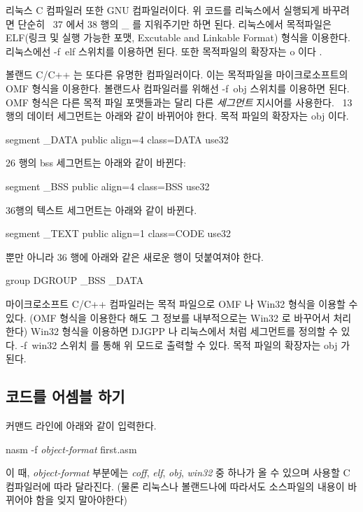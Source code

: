 리눅스 C 컴파일러 또한 GNU 컴파일러이다.  위 코드를 리눅스에서 실행되게 바꾸려면 단순히 ~37 에서 38 행의 \_ 를 지워주기만
하면 된다. 리눅스에서 목적파일은 ELF(링크 및 실행 가능한 포맷, Excutable and Linkable Format) 형식을 이용한다. 리눅스에선 {\code -f~elf} 스위치를
이용하면 된다. 또한 목적파일의 확장자는 {\code o} 이다 . 

볼랜드 C/C++  는 또다른 유명한 컴파일러이다. 이는 목적파일을 마이크로소프트의 OMF 형식을 이용한다. 볼랜드사 컴파일러를
위해선 {\code -f~obj} 스위치를 이용하면 된다. OMF 형식은 다른 목적 파일 포맷들과는 달리 다른 \emph{세그먼트} 지시어를 사용한다.  ~13 행의 데이터
세그먼트는 아래와 같이 바뀌어야 한다. 목적 파일의 확장자는 {\code obj} 이다.

\begin{CodeQuote}
segment \_DATA public align=4 class=DATA use32
\end{CodeQuote}
26 행의 bss 세그먼트는 아래와 같이 바뀐다:
\begin{CodeQuote}
segment \_BSS public align=4 class=BSS use32
\end{CodeQuote}
36행의 텍스트 세그먼트는 아래와 같이 바뀐다. 
\begin{CodeQuote}
segment \_TEXT public align=1 class=CODE use32
\end{CodeQuote}
뿐만 아니라 36 행에 아래와 같은 새로운 행이 덧붙여져야 한다. 
\begin{CodeQuote}
group DGROUP \_BSS \_DATA
\end{CodeQuote}

마이크로소프트 C/C++  컴파일러는 목적 파일으로 OMF 나 Win32 형식을 이용할 수 있다. (OMF 형식을 이용한다 해도
그 정보를 내부적으로는 Win32 로 바꾸어서 처리한다) Win32 형식을 이용하면 DJGPP 나 리눅스에서 처럼 세그먼트를 정의할 수 있다. {\code -f~win32} 스위치
를 통해 위 모드로 출력할 수 있다. 목적 파일의 확장자는 {\code obj} 가 된다. 

\subsection{코드를 어셈블 하기}

커맨드 라인에 아래와 같이 입력한다.

\begin{CodeQuote}
nasm -f {\em object-format} first.asm
\end{CodeQuote}
이 때, {\em object-format} 부분에는 {\em coff\/}, {\em elf\/}, {\em obj}, {\em win32} 중 하나가 올 수 있으며 사용할 C 컴파일러에 따라 달라진다. 
(물론 리눅스나 볼랜드나에 따라서도 소스파일의 내용이 바뀌어야 함을 잊지 말아야한다)


